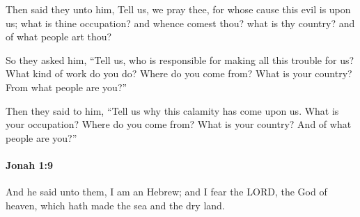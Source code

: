 			\begin{versebox}
					\item[BHS] 
					\item[LXX] 
					\item[ASV] Then said they unto him, Tell us, we pray thee, for whose cause this evil is upon us; what is thine occupation? and whence comest thou? what is thy country? and of what people art thou?
					\item[NIV] So they asked him, “Tell us, who is responsible for making all this trouble for us? What kind of work do you do? Where do you come from? What is your country? From what people are you?”
					\item[NRSV] Then they said to him, “Tell us why this calamity has come upon us. What is your occupation? Where do you come from? What is your country? And of what people are you?”
			\end{versebox}

		\paragraph{Jonah 1:9} %
			\label{JONAH-1-9}

			And he said unto them, I am an Hebrew; and I fear the LORD, the God of heaven, which hath made the sea and the dry land.

